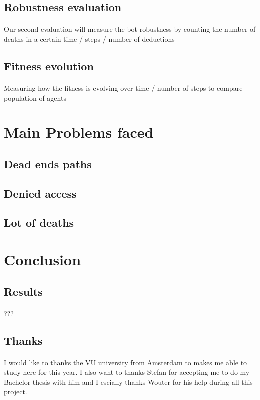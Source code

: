 \documentclass{article}
\begin{document}
	\subsection{Robustness evaluation}
		\paragraph{}
			Our second evaluation will measure the bot robustness by counting the number of deaths
			in a certain time / steps / number of deductions
	\subsection{Fitness evolution}
		\paragraph{}
			Measuring how the fitness is evolving over time / number of steps to compare population of agents

\section{Main Problems faced}
	\subsection{Dead ends paths}
	\subsection{Denied access}
	\subsection{Lot of deaths}

\newpage
\section{Conclusion}
	\subsection{Results}
		\paragraph{}
			???
	\subsection{Thanks}
		\paragraph{}
			I would like to thanks the VU university from Amsterdam to makes me able to study here for this year.
			I also want to thanks Stefan for accepting me to do my Bachelor thesis with him
			and I escially thanks Wouter for his help during all this project.
\end{document}
